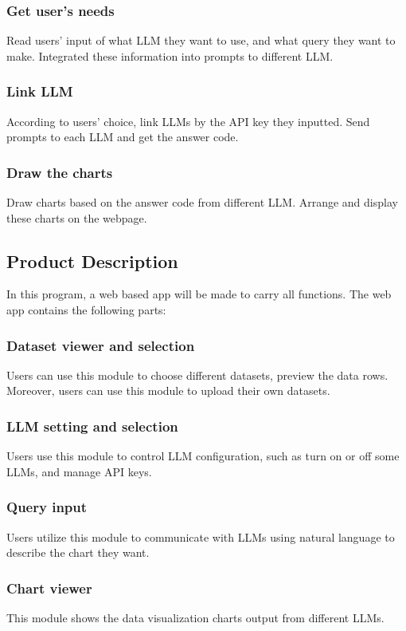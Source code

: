 \documentclass[conference]{IEEEtran}
\begin{document}
        \subsubsection{Get user's needs}
            Read users' input of what LLM they want to use, and what query they want to make. Integrated these information into prompts to different LLM.
        
        \subsubsection{Link LLM}
            According to users' choice, link LLMs by the API key they inputted. Send prompts to each LLM and get the answer code.

        \subsubsection{Draw the charts}
            Draw charts based on the answer code from different LLM. Arrange and display these charts on the webpage.

    \subsection{Product Description}
            In this program, a web based app will be made to carry all functions. The web app contains the following parts:
            \subsubsection{Dataset viewer and selection}
            Users can use this module to choose different datasets, preview the data rows. Moreover, users can use this module to upload their own datasets.

            \subsubsection{LLM setting and selection}
            Users use this module to control LLM configuration, such as turn on or off some LLMs, and manage API keys.

            \subsubsection{Query input}
            Users utilize this module to communicate with LLMs using natural language to describe the chart they want.

            \subsubsection{Chart viewer}
            This module shows the data visualization charts output from different LLMs. 
\end{document}
